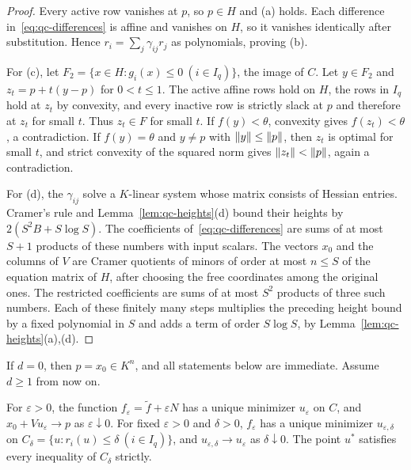\begin{proof}
Every active row vanishes at $p$, so $p\in H$ and (a) holds. Each difference
in~\eqref{eq:qc-differences} is affine and vanishes on $H$, so it vanishes
identically after substitution. Hence $r_i=\sum_j\gamma_{ij}r_j$ as
polynomials, proving (b).

For (c), let $F_2=\{x\in H:g_i(x)\le0\ (i\in I_q)\}$, the image of $C$. Let
$y\in F_2$ and $z_t=p+t(y-p)$ for $0<t\le1$. The active affine rows hold on
$H$, the rows in $I_q$ hold at $z_t$ by convexity, and every inactive row is
strictly slack at $p$ and therefore at $z_t$ for small $t$. Thus $z_t\in F$
for small $t$. If $f(y)<\theta$, convexity gives $f(z_t)<\theta$, a
contradiction. If $f(y)=\theta$ and $y\ne p$ with $\left\lVert y\right\rVert\le\left\lVert p\right\rVert$, then
$z_t$ is optimal for small $t$, and strict convexity of the squared norm
gives $\left\lVert z_t\right\rVert<\left\lVert p\right\rVert$, again a contradiction.

For (d), the $\gamma_{ij}$ solve a $K$-linear system whose matrix consists of
Hessian entries. Cramer's rule and Lemma~\ref{lem:qc-heights}(d) bound their
heights by $2(S^2B+S\log S)$. The coefficients of~\eqref{eq:qc-differences}
are sums of at most $S+1$ products of these numbers with input scalars. The
vectors $x_0$ and the columns of $V$ are Cramer quotients of minors of order
at most $n\le S$ of the equation matrix of $H$, after choosing the free
coordinates among the original ones. The restricted coefficients are sums of
at most $S^2$ products of three such numbers. Each of these finitely many
steps multiplies the preceding height bound by a fixed polynomial in $S$ and
adds a term of order $S\log S$, by Lemma~\ref{lem:qc-heights}(a),(d).
\end{proof}

If $d=0$, then $p=x_0\in K^n$, and all statements below are immediate. Assume
$d\ge1$ from now on.

\begin{lemma}
\label{lem:qc-ordered}
For $\varepsilon>0$, the function $f_\varepsilon=\tilde f+\varepsilon N$ has
a unique minimizer $u_\varepsilon$ on $C$, and $x_0+Vu_\varepsilon\to p$ as
$\varepsilon\downarrow0$. For fixed $\varepsilon>0$ and $\delta>0$,
$f_\varepsilon$ has a unique minimizer $u_{\varepsilon,\delta}$ on
$C_\delta=\{u:r_i(u)\le\delta\ (i\in I_q)\}$, and
$u_{\varepsilon,\delta}\to u_\varepsilon$ as $\delta\downarrow0$. The point
$u^*$ satisfies every inequality of $C_\delta$ strictly.
\end{lemma}

